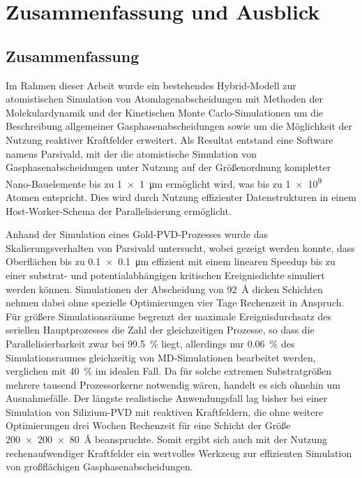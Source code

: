 \chapter{Zusammenfassung und Ausblick}
\label{summary}


\section{Zusammenfassung}

Im Rahmen dieser Arbeit wurde ein bestehendes Hybrid-Modell zur atomistischen Simulation von Atomlagenabscheidungen mit Methoden der Molekulardynamik und der Kinetischen Monte Carlo-Simulationen um die Beschreibung allgemeiner Gasphasenabscheidungen sowie um die Möglichkeit der Nutzung reaktiver Kraftfelder erweitert.
Als Resultat entstand eine Software namens Parsivald, mit der die atomistische Simulation von Gasphasenabscheidungen unter Nutzung auf der Größenordnung kompletter Nano-Bauelemente bis zu \SI{1x1}{\micro\meter} ermöglicht wird, was bis zu \num{1e9} Atomen entspricht.
Dies wird durch Nutzung effizienter Datenstrukturen in einem Host-Worker-Schema der Parallelisierung ermöglicht.


Anhand der Simulation eines Gold-PVD-Prozesses wurde das Skalierungsverhalten von Parsivald untersucht, wobei gezeigt werden konnte, dass Oberflächen bis zu \SI{0.1x0.1}{\micro\meter} effizient mit einem linearen Speedup bis zu einer substrat- und potentialabhängigen kritischen Ereignisdichte simuliert werden können.
Simulationen der Abscheidung von \SI{92}{\angstrom} dicken Schichten nehmen dabei ohne spezielle Optimierungen vier Tage Rechenzeit in Anspruch.
Für größere Simulationsräume begrenzt der maximale Ereignisdurchsatz des seriellen Hauptprozesses die Zahl der gleichzeitigen Prozesse, so dass die Parallelisierbarkeit zwar bei \SI{99.5}{\percent} liegt, allerdings nur \SI{0.06}{\percent} des Simulationsraumes gleichzeitig von MD-Simulationen bearbeitet werden, verglichen mit \SI{40}{\percent} im idealen Fall.
Da für solche extremen Substratgrößen mehrere tausend Prozessorkerne notwendig wären, handelt es sich ohnehin um Ausnahmefälle.
Der längste realistische Anwendungsfall lag bisher bei einer Simulation von Silizium-PVD mit reaktiven Kraftfeldern, die ohne weitere Optimierungen drei Wochen Rechenzeit für eine Schicht der Größe \SI{200x200x80}{\angstrom} beanspruchte.
Somit ergibt sich auch mit der Nutzung rechenaufwendiger Kraftfelder ein wertvolles Werkzeug zur effizienten Simulation von großflächigen Gasphasenabscheidungen.


